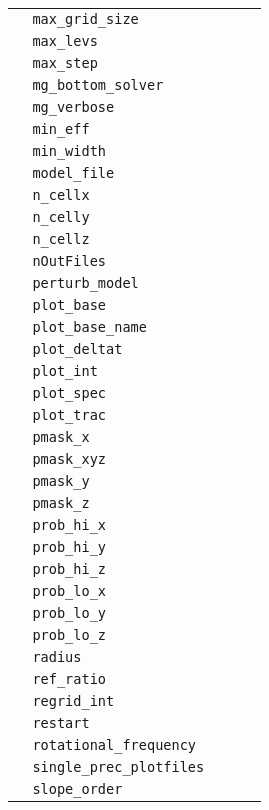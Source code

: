 \begin{center}
\begin{longtable}{|l|p{3.0in}|l|}
\verb=  max_grid_size  = &   &   \\
\verb=  max_levs  = &   &   \\
\verb=  max_step  = &   &   \\
\verb=  mg_bottom_solver  = &   &   \\
\verb=  mg_verbose  = &   &   \\
\verb=  min_eff  = &   &   \\
\verb=  min_width  = &   &   \\
\verb=  model_file  = &   &   \\
\verb=  n_cellx  = &   &   \\
\verb=  n_celly  = &   &   \\
\verb=  n_cellz  = &   &   \\
\verb=  nOutFiles  = &   &   \\
\verb=  perturb_model  = &   &   \\
\verb=  plot_base  = &   &   \\
\verb=  plot_base_name  = &   &   \\
\verb=  plot_deltat  = &   &   \\
\verb=  plot_int  = &   &   \\
\verb=  plot_spec  = &   &   \\
\verb=  plot_trac  = &   &   \\
\verb=  pmask_x  = &   &   \\
\verb=  pmask_xyz  = &   &   \\
\verb=  pmask_y  = &   &   \\
\verb=  pmask_z  = &   &   \\
\verb=  prob_hi_x  = &   &   \\
\verb=  prob_hi_y  = &   &   \\
\verb=  prob_hi_z  = &   &   \\
\verb=  prob_lo_x  = &   &   \\
\verb=  prob_lo_y  = &   &   \\
\verb=  prob_lo_z  = &   &   \\
\verb=  radius  = &   &   \\
\verb=  ref_ratio  = &   &   \\
\verb=  regrid_int  = &   &   \\
\verb=  restart  = &   &   \\
\verb=  rotational_frequency  = &   &   \\
\verb=  single_prec_plotfiles  = &   &   \\
\verb=  slope_order  = &   &   \\

\end{longtable}
\end{center}
